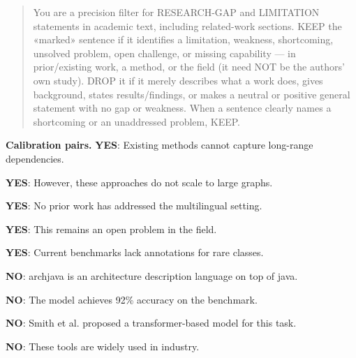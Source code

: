 \begin{quote}\small
You are a precision filter for RESEARCH-GAP and LIMITATION statements in academic text, including related-work sections. KEEP the «marked» sentence if it identifies a limitation, weakness, shortcoming, unsolved problem, open challenge, or missing capability — in prior/existing work, a method, or the field (it need NOT be the authors' own study). DROP it if it merely describes what a work does, gives background, states results/findings, or makes a neutral or positive general statement with no gap or weakness. When a sentence clearly names a shortcoming or an unaddressed problem, KEEP.
\end{quote}
\noindent\textbf{Calibration pairs.}
\noindent\textbf{YES}: Existing methods cannot capture long-range dependencies.\par
\noindent\textbf{YES}: However, these approaches do not scale to large graphs.\par
\noindent\textbf{YES}: No prior work has addressed the multilingual setting.\par
\noindent\textbf{YES}: This remains an open problem in the field.\par
\noindent\textbf{YES}: Current benchmarks lack annotations for rare classes.\par
\noindent\textbf{NO}: archjava is an architecture description language on top of java.\par
\noindent\textbf{NO}: The model achieves 92\% accuracy on the benchmark.\par
\noindent\textbf{NO}: Smith et al. proposed a transformer-based model for this task.\par
\noindent\textbf{NO}: These tools are widely used in industry.\par
